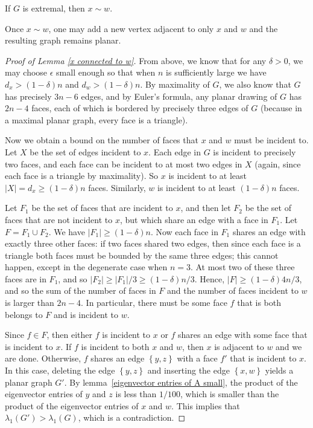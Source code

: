 \begin{lemma}\label{x connected to w}
If $G$ is extremal, then $x\sim w$.
\end{lemma}

Once $x\sim w$, one may add a new vertex adjacent to only $x$ and $w$ and the resulting graph remains planar.

\begin{proof}[Proof of Lemma \ref{x connected to w}]
From above, we know that for any $\delta > 0$, we may choose $\epsilon$ small enough so that when $n$ is sufficiently
large we have $d_x > (1-\delta)n$ and $d_w > (1-\delta)n$.  By maximality
of $G$, we also know that $G$ has precisely $3n-6$ edges, and by Euler's formula, any planar drawing of $G$ has $2n-4$ faces, each of which is bordered by precisely three edges of $G$ (because in a maximal planar graph, every face is a triangle).    


Now we obtain a bound on the number of faces that $x$ and $w$ must be incident to.  Let $X$ be the set of edges incident to $x$.  Each edge in $G$ is incident to precisely two faces, and each face can be incident to at most two edges in $X$ (again, since each face is a triangle by maximality).  So $x$ is incident to at least $|X| = d_x \geq (1-\delta)n$ faces.  Similarly, $w$ is incident to at least $(1-\delta)n$ faces. 


Let $F_1$ be the set of faces that are incident to $x$, and then let $F_2$ be the set of faces that are not incident to $x$, but which share an edge with a face in $F_1$.  Let $F = F_1 \cup F_2$.  We have $|F_1| \geq (1-\delta)n$.  Now each
face in $F_1$ shares an edge with exactly three other faces:  if two faces shared two edges, then since each face is a triangle
both faces must be bounded by the same three edges;  this cannot happen, except in the degenerate case when $n=3$.  At most two of these three faces are in $F_1$, and so $|F_2| \geq |F_1| / 3 \geq (1-\delta)n / 3$.  Hence, $|F| \geq (1-\delta)4n / 3$, and so the sum of the number of faces
in $F$ and the number of faces incident to  $w$ is larger than $2n-4$.  In 
particular, there must be some face $f$ that is both belongs to $F$ and is incident to $w$.


Since $f \in F$, then either $f$ is incident to $x$ or $f$ shares an edge with some face that is incident to $x$.  If $f$ is incident to both $x$ and $w$, then $x$ is adjacent to $w$ and 
we are done.  Otherwise, $f$ shares an edge $\left\{y,z\right\}$ with a face $f'$ that is incident to $x$.  In this case, deleting the edge $\left\{y,z\right\}$ and inserting the edge $\left\{x,w\right\}$ yields a planar graph $G'$.  By lemma~\ref{eigenvector entries of A small}, 
the product of the eigenvector entries of $y$ and $z$ is less than $1/100$,
which is smaller than the product of the eigenvector entries of $x$ and $w$.  
This implies that $\lambda_1(G') > \lambda_1(G)$, which is a contradiction.
\end{proof}

